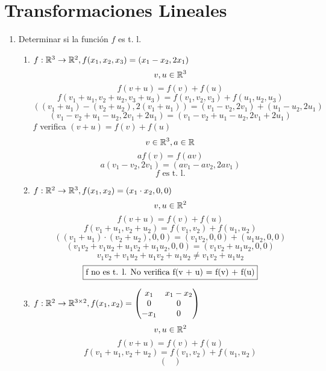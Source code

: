 \documentclass[../practica.root.tex]{subfiles}
\begin{document}
\section{Transformaciones Lineales}

\begin{enumerate}
    \item Determinar si la función $f$ es t. l.
          \begin{enumerate}
              \item \( f: \mathbb{R}^3 \to \mathbb{R}^2, f(x_1, x_2, x_3) = (x_1 - x_2, 2x_1) \)
                    \[ v, u \in \mathbb{R}^3 \]
                    \[ f(v + u) = f(v) + f(u) \]
                    \[ f(v_1 + u_1,v_2 + u_2,v_3 + u_3) = f(v_1,v_2,v_3) + f(u_1,u_2,u_3) \]
                    \[ ((v_1 + u_1) - (v_2 + u_2), 2(v_1 + u_1)) = (v_1 - v_2, 2v_1) + (u_1 - u_2, 2u_1) \]
                    \[ (v_1 - v_2 + u_1 - u_2, 2v_1 + 2u_1) = (v_1 - v_2 + u_1 - u_2, 2v_1 + 2u_1) \]
                    $f$ verifica $(v + u) = f(v) + f(u)$
                    \[ v \in \mathbb{R}^3, a \in \mathbb{R} \]
                    \[ af(v) = f(av) \]
                    \[ a(v_1 - v_2, 2v_1) = (av_1 - av_2, 2av_1) \]
                    \[ \boxed{f \text{ es t. l.}} \]
              \item \( f: \mathbb{R}^2 \to \mathbb{R}^3, f(x_1,x_2) = (x_1\cdot x_2,0,0) \)
                    \[ v, u \in \mathbb{R}^2 \]
                    \[ f(v + u) = f(v) + f(u) \]
                    \[ f(v_1 + u_1, v_2 + u_2) = f(v_1, v_2) + f(u_1, u_2) \]
                    \[ ((v_1 + u_1)\cdot(v_2 + u_2),0,0) = (v_1v_2,0,0) + (u_1u_2,0,0) \]
                    \[ (v_1v_2 + v_1u_2 + u_1v_2 + u_1u_2,0,0) = (v_1v_2 + u_1u_2,0,0) \]
                    \[ v_1v_2 + v_1u_2 + u_1v_2 + u_1u_2 \neq v_1v_2 + u_1u_2 \]
                    \[ \boxed{$f$ \text{ no es t. l. No verifica } $f(v + u) = f(v) + f(u)$} \]
              \item \( f: \mathbb{R}^2 \to \mathbb{R}^{3\times2}, f(x_1,x_2) =
                    \begin{pmatrix}
                        x_1  & x_1 - x_2 \\
                        0    & 0         \\
                        -x_1 & 0
                    \end{pmatrix}
                    \)
                    \[ v, u \in \mathbb{R}^2 \]
                    \[ f(v + u) = f(v) + f(u) \]
                    \[ f(v_1 + u_1, v_2 + u_2) = f(v_1, v_2) + f(u_1, u_2) \]
                    \[
                        \begin{pmatrix}

\end{pmatrix}\]
\end{enumerate}
\end{enumerate}
\end{document}
